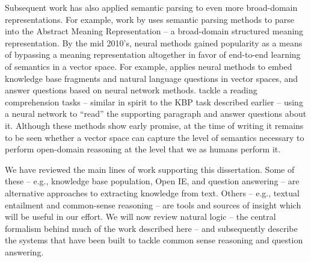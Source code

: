 Subsequent work has also applied semantic parsing to even more broad-domain representations.
For example, work by  uses semantic parsing methods to parse into
  the Abstract Meaning Representation \cite{key:2013banarescu-amr} -- a 
  broad-domain structured meaning representation.
By the mid 2010's, neural methods gained popularity as a means of bypassing a meaning representation
  altogether in favor of end-to-end learning of semantics in a vector space.
For example,  applies neural methods
  to embed knowledge base fragments and natural language questions in vector spaces,
   and answer questions based on neural network methods.
 tackle a reading comprehension tasks -- similar in spirit
  to the KBP task described earlier -- using a neural network to ``read'' the supporting
  paragraph and answer questions about it.
Although these methods show early promise, at the time of writing it remains to be seen
  whether a vector space can capture the level of semantics necessary to perform
  open-domain reasoning at the level that we as humans perform it.


We have reviewed the main lines of work supporting this dissertation.
Some of these -- e.g., knowledge base population, Open IE, and question answering -- are 
  alternative approaches to extracting knowledge from text.
Others -- e.g., textual entailment and common-sense reasoning -- are tools and sources of insight
  which will be useful in our effort.
We will now review natural logic -- the central formalism behind much of the work described here --
  and subsequently describe the systems that have been built to tackle common sense reasoning and
  question answering.
